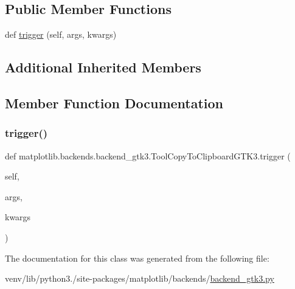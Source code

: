 \subsection*{Public Member Functions}
\begin{DoxyCompactItemize}
\item 
def \hyperlink{classmatplotlib_1_1backends_1_1backend__gtk3_1_1ToolCopyToClipboardGTK3_adf07abb48517ca8048d8b0d7bf1de4a1}{trigger} (self, args, kwargs)
\end{DoxyCompactItemize}
\subsection*{Additional Inherited Members}


\subsection{Member Function Documentation}
\mbox{\label{classmatplotlib_1_1backends_1_1backend__gtk3_1_1ToolCopyToClipboardGTK3_adf07abb48517ca8048d8b0d7bf1de4a1}} 
\subsubsection{\texorpdfstring{trigger()}{trigger()}}
{\footnotesize\ttfamily def matplotlib.\+backends.\+backend\+\_\+gtk3.\+Tool\+Copy\+To\+Clipboard\+G\+T\+K3.\+trigger (\begin{DoxyParamCaption}\item[{}]{self,  }\item[{}]{args,  }\item[{}]{kwargs }\end{DoxyParamCaption})}



The documentation for this class was generated from the following file\+:\begin{DoxyCompactItemize}
\item 
venv/lib/python3./site-\/packages/matplotlib/backends/\hyperlink{backend__gtk3_8py}{backend\+\_\+gtk3.\+py}\end{DoxyCompactItemize}
